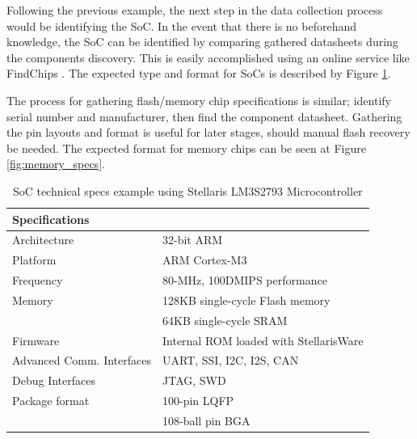 Following the previous example, the next step in the data collection process would be identifying the SoC. In the event that there is no beforehand knowledge, the SoC can be identified by comparing gathered datasheets during the components discovery. This is easily accomplished using an online service like FindChips \autocite{FindchipsElectronicPart}. The expected type and format for SoCs is described by Figure \ref{fig:soc_specs}.

The process for gathering flash/memory chip specifications is similar; identify serial number and manufacturer, then find the component datasheet. Gathering the pin layouts and format is useful for later stages, should manual flash recovery be needed. The expected format for memory chips can be seen at Figure \ref{fig:memory_specs}.

\begin{table}[H]
  \centering
  \begin{tabular}{|p{6cm}|p{9cm}|}
    \hline\rowcolor{gray!30}

    \textbf{Specifications} &  \\
    \hline

    Architecture & 32-bit ARM \\
    \hline

    Platform & ARM Cortex-M3 \\
    \hline

    Frequency & 80-MHz, 100DMIPS performance \\
    \hline

    Memory & 128KB single-cycle Flash memory \\
     & 64KB single-cycle SRAM \\
    \hline

    Firmware & Internal ROM loaded with StellarisWare \\
    \hline

    Advanced Comm. Interfaces & UART, SSI, I2C, I2S, CAN \\
    \hline

    Debug Interfaces & JTAG, SWD \\
    \hline

    Package format & 100-pin LQFP \\
    & 108-ball pin BGA \\
    \hline

  \end{tabular}
  \caption{SoC technical specs example using Stellaris LM3S2793 Microcontroller}
  \label{fig:soc_specs}%
\end{table}

